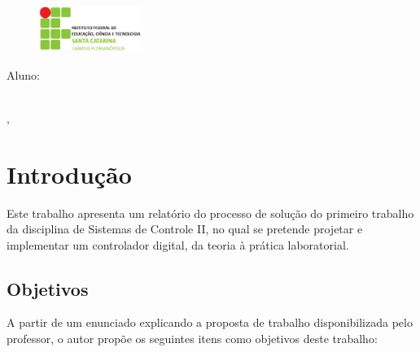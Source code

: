 \documentclass[
	12pt,				%
	article,			%
	openright,			%
	oneside,
	a4paper,			%
	chapter=TITLE,		%
	section=TITLE,		%
	english,			%
	french,				%
	spanish,			%
	brazil,				%
]{abntex2}
\renewcommand{\imprimircapa}{
	\begin{capa}
		\SingleSpacing
		\begin{adjustwidth}{}{}			
			\begin{minipage}{1\textwidth}
				\begin{figure}
					\vspace*{-1em}\includegraphics[height=4em]{logotipo_ifsc.jpg}
				\end{figure}
				\imprimirinstituicao 
			\end{minipage}
			\vfill
			\begin{center}\ABNTEXchapterfont\LARGE\imprimirtitulo
				\vfill
				\small
				\begin{center}
					Aluno: \imprimirautor\\[1em]
					\imprimirorientadorRotulo\imprimirorientador\\
					\imprimircoorientadorRotulo\imprimircoorientador
				\end{center}
				\vfill
				\imprimirlocal, \imprimirdata
			\end{center}	
		\end{adjustwidth}
	\end{capa}
}
\begin{document}
	
	\frenchspacing 
	
	
	\imprimircapa
	
	\tableofcontents*
	
	\clearpage
	\listoffigures
	\vspace{34pt}
	\listoftables
	
	\textual
	
	\pagebreak
	
	\chapter*[Introdução]{Introdução}
	
    Este trabalho apresenta um relatório do processo de solução do primeiro trabalho da disciplina de Sistemas de Controle II, no qual se pretende projetar e implementar um controlador digital, da teoria à prática laboratorial.
	
	\section[Objetivos]{Objetivos}
	
	A partir de um enunciado explicando a proposta de trabalho disponibilizada pelo professor, o autor propõe os seguintes itens como objetivos deste trabalho:
	
\end{document}
